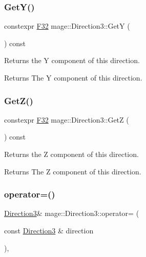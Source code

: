 \subsubsection{\texorpdfstring{Get\+Y()}{GetY()}}
{\footnotesize\ttfamily constexpr \mbox{\hyperlink{namespacemage_aa97e833b45f06d60a0a9c4fc22ae02c0}{F32}} mage\+::\+Direction3\+::\+GetY (\begin{DoxyParamCaption}{ }\end{DoxyParamCaption}) const\hspace{0.3cm}{\ttfamily [noexcept]}}

Returns the Y component of this direction.

\begin{DoxyReturn}{Returns}
The Y component of this direction. 
\end{DoxyReturn}
\mbox{\label{structmage_1_1_direction3_a6ee9bc60c92c37c6ff7e1b432bf191c7}} 
\subsubsection{\texorpdfstring{Get\+Z()}{GetZ()}}
{\footnotesize\ttfamily constexpr \mbox{\hyperlink{namespacemage_aa97e833b45f06d60a0a9c4fc22ae02c0}{F32}} mage\+::\+Direction3\+::\+GetZ (\begin{DoxyParamCaption}{ }\end{DoxyParamCaption}) const\hspace{0.3cm}{\ttfamily [noexcept]}}

Returns the Z component of this direction.

\begin{DoxyReturn}{Returns}
The Z component of this direction. 
\end{DoxyReturn}
\mbox{\label{structmage_1_1_direction3_a3bbb78215de8d52528c15c2e150d4a53}} 
\subsubsection{\texorpdfstring{operator=()}{operator=()}\hspace{0.1cm}{\footnotesize\ttfamily [1/2]}}
{\footnotesize\ttfamily \mbox{\hyperlink{structmage_1_1_direction3}{Direction3}}\& mage\+::\+Direction3\+::operator= (\begin{DoxyParamCaption}\item[{const \mbox{\hyperlink{structmage_1_1_direction3}{Direction3}} \&}]{direction }\end{DoxyParamCaption})\hspace{0.3cm}{\ttfamily [default]}, {\ttfamily [noexcept]}}

